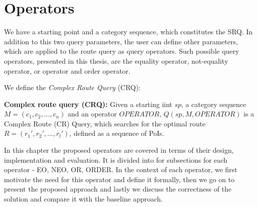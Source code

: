 \chapter{Operators} 
\label{sec:operators}

We have a starting point and a category sequence, which constitutes the SRQ. In addition to this two query parameters, the user can define other parameters, which are applied to the route query as query operators. Such possible query operators, presented in this thesis, are the equality operator, not-equality operator, or operator and order operator. 

We define the \textit{Complex Route Query} (CRQ):

\textbf{Complex route query (CRQ):} Given a starting iint $sp$, a category sequence $M = (c_1, c_2, ..., c_n)$ and an operator $OPERATOR$, $Q(sp, M, OPERATOR)$ is a Complex Route (CR) Query, which searches for the optimal route $R = (r_1', r_2', ..., r_l')$, defined as a sequence of PoIs.

In this chapter the proposed operators are covered in terms of their design, implementation and evaluation. It is divided into for subsections for each operator - EO, NEO, OR, ORDER. In the context of each operator, we first motivate the need for this operator and define it formally, then we go on to present the proposed approach and lastly we discuss the correctness of the solution and compare it with the baseline approach.
